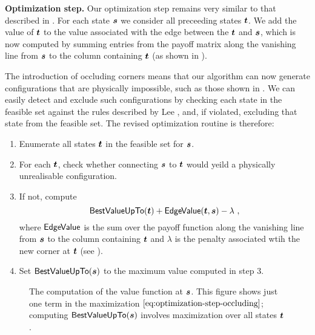 \textbf{Optimization step.} Our optimization step remains very similar
to that described in . For each state $\State$ we
consider all preceeding states $\OtherState$. We add the value of
$\OtherState$ to the value associated with the edge between the
$\OtherState$ and $\State$, which is now computed by summing entries
from the payoff matrix along the vanishing line from $\State$ to the
column containing $\OtherState$ (as shown in
).

The introduction of occluding corners means that our algorithm can now
generate configurations that are physically impossible, such as those
shown in . We can easily detect and
exclude such configurations by checking each state in the feasible set
against the rules described by Lee \etal \cite{Lee09}, and, if
violated, excluding that state from the feasible set. The revised
optimization routine is therefore:
\begin{enumerate}
  \item{Enumerate all states $\OtherState$ in the feasible set for
    $\State$.}
  \item{For each $\OtherState$, check whether connecting $\State$ to $\OtherState$
    would yeild a physically unrealisable configuration.}
  \item{If not, compute
    \begin{equation}
      \label{eq:optimization-step-occluding}
      \bestvalue(\OtherState)+\edgevalue(\OtherState,\State)-\lambda ~,
    \end{equation}
    where $\edgevalue$ is the sum over the payoff function along the
    vanishing line from $\State$ to the column containing
    $\OtherState$ and $\lambda$ is the penalty associated wtih the new
    corner at $\OtherState$ (see ).}
  \item{Set $\bestvalue(\State)$ to the maximum value computed in
    step 3.}
\end{enumerate}

\begin{figure}[tb]
  \centering
  \caption{The computation of the value function at $\State$. This
    figure shows just one term in the maximization
    $\eqnref{optimization-step-occluding}$; computing $\bestvalue(\State)$
    involves maximization over all states $\OtherState$.}
  \label{fig:recurrence-value-occluding}
\end{figure}

